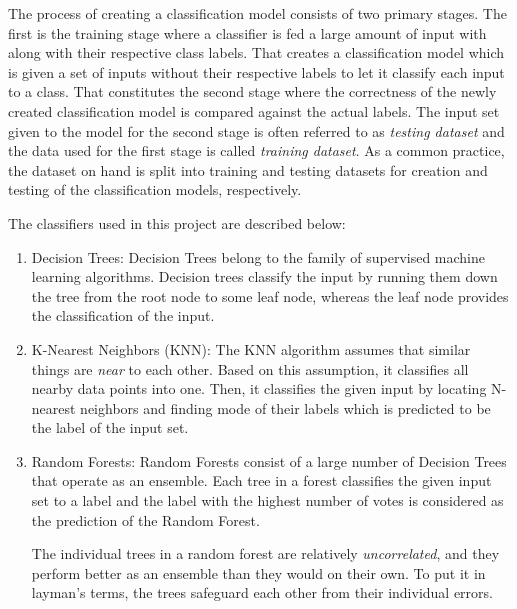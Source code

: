 \documentclass[conference]{IEEEtran}
\begin{document}
\par The process of creating a classification model consists of two primary stages.
The first is the training stage where a classifier is fed a large amount of input with along with their respective class labels.
That creates a classification model which is given a set of inputs without their respective labels to let it classify each input to a class.
That constitutes the second stage where the correctness of the newly created classification model is compared against the actual labels.
The input set given to the model for the second stage is often referred to as \emph{testing dataset} and the data used for the first stage is called \emph{training dataset}.
As a common practice, the dataset on hand is split into training and testing datasets for creation and testing of the classification models, respectively.

\par The classifiers used in this project are described below:
\begin{enumerate}
    \item Decision Trees:
          Decision Trees belong to the family of supervised machine learning algorithms.
          Decision trees classify the input by running them down the tree from the root node to some leaf node, whereas the leaf node provides the classification of the input.
    \item K-Nearest Neighbors (KNN):
          The KNN algorithm assumes that similar things are \emph{near} to each other.
          Based on this assumption, it classifies all nearby data points into one.
          Then, it classifies the given input by locating N-nearest neighbors and finding mode of their labels which is predicted to be the label of the input set.
    \item Random Forests:
          Random Forests consist of a large number of Decision Trees that operate as an ensemble.
          Each tree in a forest classifies the given input set to a label and the label with the highest number of votes is considered as the prediction of the Random Forest.
          \par The individual trees in a random forest are relatively \emph{uncorrelated}, and they perform better as an ensemble than they would on their own.
          To put it in layman's terms, the trees safeguard each other from their individual errors.
\end{enumerate}
\end{document}
